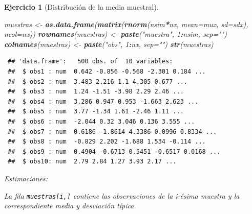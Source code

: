\documentclass[
  spanish,
  10pt,
]{book}
\newenvironment{Shaded}{\begin{snugshade}}{\end{snugshade}}
\newcommand{\AttributeTok}[1]{\textcolor[rgb]{0.13,0.29,0.53}{#1}}
\newcommand{\DecValTok}[1]{\textcolor[rgb]{0.00,0.00,0.81}{#1}}
\newcommand{\FunctionTok}[1]{\textcolor[rgb]{0.13,0.29,0.53}{\textbf{#1}}}
\newcommand{\NormalTok}[1]{#1}
\newcommand{\OtherTok}[1]{\textcolor[rgb]{0.56,0.35,0.01}{#1}}
\newcommand{\SpecialCharTok}[1]{\textcolor[rgb]{0.81,0.36,0.00}{\textbf{#1}}}
\newcommand{\StringTok}[1]{\textcolor[rgb]{0.31,0.60,0.02}{#1}}
\theoremstyle{break}
\newtheorem{exercise}{Ejercicio}[chapter]
\theoremstyle{nonumberplain}
\begin{document}
\begin{exercise}[Distribución de la media muestral]
\begin{enumerate}
\begin{Shaded}
\begin{Highlighting}[]
\NormalTok{muestras }\OtherTok{\textless{}{-}} \FunctionTok{as.data.frame}\NormalTok{(}\FunctionTok{matrix}\NormalTok{(}\FunctionTok{rnorm}\NormalTok{(nsim}\SpecialCharTok{*}\NormalTok{nx, }\AttributeTok{mean=}\NormalTok{mux, }\AttributeTok{sd=}\NormalTok{sdx), }\AttributeTok{ncol=}\NormalTok{nx))}
\FunctionTok{rownames}\NormalTok{(muestras) }\OtherTok{\textless{}{-}} \FunctionTok{paste}\NormalTok{(}\StringTok{"muestra"}\NormalTok{, }\DecValTok{1}\SpecialCharTok{:}\NormalTok{nsim, }\AttributeTok{sep=}\StringTok{""}\NormalTok{)}
\FunctionTok{colnames}\NormalTok{(muestras) }\OtherTok{\textless{}{-}} \FunctionTok{paste}\NormalTok{(}\StringTok{"obs"}\NormalTok{, }\DecValTok{1}\SpecialCharTok{:}\NormalTok{nx, }\AttributeTok{sep=}\StringTok{""}\NormalTok{)}
\FunctionTok{str}\NormalTok{(muestras)}
\end{Highlighting}
\end{Shaded}

\begin{verbatim}
 ## 'data.frame':   500 obs. of  10 variables:
 ##  $ obs1 : num  0.642 -0.856 -0.568 -2.301 0.184 ...
 ##  $ obs2 : num  3.483 2.216 1.1 4.305 0.677 ...
 ##  $ obs3 : num  1.24 -1.51 -3.98 2.29 2.46 ...
 ##  $ obs4 : num  3.286 0.947 0.953 -1.663 2.623 ...
 ##  $ obs5 : num  3.77 -1.34 1.61 -2.46 1.11 ...
 ##  $ obs6 : num  -2.044 0.32 3.046 0.136 3.555 ...
 ##  $ obs7 : num  0.6186 -1.8614 4.3386 0.0996 0.8334 ...
 ##  $ obs8 : num  -0.829 2.202 -1.688 1.534 -0.114 ...
 ##  $ obs9 : num  0.4904 -0.6713 0.5451 -0.6517 0.0168 ...
 ##  $ obs10: num  2.79 2.84 1.27 3.93 2.17 ...
\end{verbatim}

  Estimaciones:

\begin{Shaded}
\end{Shaded}

  La fila \texttt{muestras{[}i,{]}} contiene las observaciones de la i-ésima muestra y
  la correspondiente media y desviación típica.


\end{enumerate}
\end{exercise}
\end{document}

